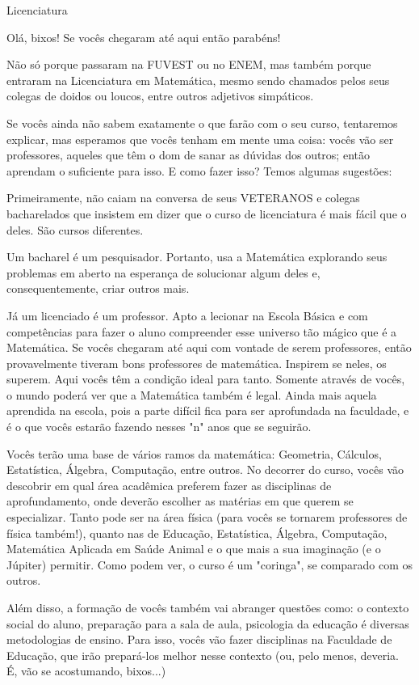 \begin{subsecao}{Licenciatura}

Olá, bixos! Se vocês chegaram até aqui então parabéns!

Não só porque passaram na FUVEST ou no ENEM, mas também porque entraram na
Licenciatura em Matemática, mesmo sendo chamados pelos seus colegas de doidos ou
loucos, entre outros adjetivos simpáticos.

Se vocês ainda não sabem exatamente o que farão com o seu curso, tentaremos
explicar, mas esperamos que vocês tenham em mente uma coisa: vocês vão ser
professores, aqueles que têm o dom de sanar as dúvidas dos outros; então
aprendam o suficiente para isso. E como fazer isso? Temos algumas sugestões:

Primeiramente, não caiam na conversa de seus VETERANOS e colegas bacharelados
que insistem em dizer que o curso de licenciatura é mais fácil que o deles. São
cursos diferentes.

Um bacharel é um pesquisador. Portanto, usa a Matemática explorando seus
problemas em aberto na esperança de solucionar algum deles e, consequentemente,
criar outros mais.

Já um licenciado é um professor. Apto a lecionar na Escola Básica e com
competências para fazer o aluno compreender esse universo tão mágico que é a
Matemática. Se vocês chegaram até aqui com vontade de serem professores, então
provavelmente tiveram bons professores de matemática. Inspirem se neles, os
superem. Aqui vocês têm a condição ideal para tanto. Somente através de vocês, o
mundo poderá ver que a Matemática também é legal. Ainda mais aquela aprendida na
escola, pois a parte difícil fica para ser aprofundada na faculdade, e é o que
vocês estarão fazendo nesses "n" anos que se seguirão.

Vocês terão uma base de vários ramos da matemática: Geometria, Cálculos,
Estatística, Álgebra, Computação, entre outros. No decorrer do curso, vocês vão
descobrir em qual área acadêmica preferem fazer as disciplinas de
aprofundamento, onde deverão escolher as matérias em que querem se especializar.
Tanto pode ser na área física (para vocês se tornarem professores de física
também!), quanto nas de Educação, Estatística, Álgebra, Computação, Matemática
Aplicada em Saúde Animal e o que mais a sua imaginação (e o Júpiter) permitir.
Como podem ver, o curso é um "coringa", se comparado com os outros.

Além disso, a formação de vocês também vai abranger questões como: o contexto
social do aluno, preparação para a sala de aula, psicologia da educação é
diversas metodologias de ensino. Para isso, vocês vão fazer disciplinas na
Faculdade de Educação, que irão prepará-los melhor nesse contexto (ou, pelo
menos, deveria. É, vão se acostumando, bixos...)


\end{subsecao}
